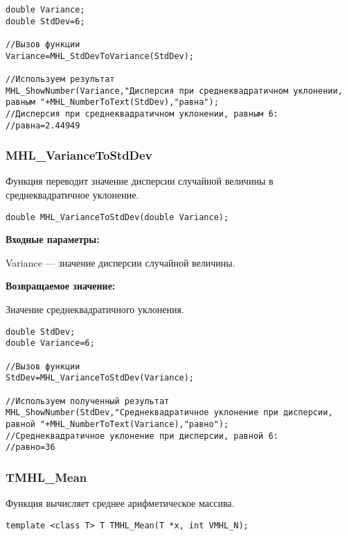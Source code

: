 \documentclass[a4paper,12pt]{article}
\begin{document}
\begin{lstlisting}[label=code_use_MHL_StdDevToVariance,caption=Пример использования]
double Variance;
double StdDev=6;

//Вызов функции
Variance=MHL_StdDevToVariance(StdDev);

//Используем результат
MHL_ShowNumber(Variance,"Дисперсия при среднеквадратичном уклонении, равным "+MHL_NumberToText(StdDev),"равна");
//Дисперсия при среднеквадратичном уклонении, равным 6:
//равна=2.44949
\end{lstlisting}

\subsubsection{MHL\_VarianceToStdDev}\label{MHL_VarianceToStdDev}

Функция переводит значение дисперсии случайной величины в среднеквадратичное уклонение.


\begin{lstlisting}[label=code_syntax_MHL_VarianceToStdDev,caption=Синтаксис]
double MHL_VarianceToStdDev(double Variance);
\end{lstlisting}

\textbf{Входные параметры:}

 Variance --- значение дисперсии случайной величины.

\textbf{Возвращаемое значение:}

 Значение среднеквадратичного уклонения.



\begin{lstlisting}[label=code_use_MHL_VarianceToStdDev,caption=Пример использования]
double StdDev;
double Variance=6;

//Вызов функции
StdDev=MHL_VarianceToStdDev(Variance);

//Используем полученный результат
MHL_ShowNumber(StdDev,"Среднеквадратичное уклонение при дисперсии, равной "+MHL_NumberToText(Variance),"равно");
//Среднеквадратичное уклонение при дисперсии, равной 6:
//равно=36
\end{lstlisting}

\subsubsection{TMHL\_Mean}\label{TMHL_Mean}

Функция вычисляет среднее арифметическое массива.


\begin{lstlisting}[label=code_syntax_TMHL_Mean,caption=Синтаксис]
template <class T> T TMHL_Mean(T *x, int VMHL_N);
\end{lstlisting}
\end{document}
